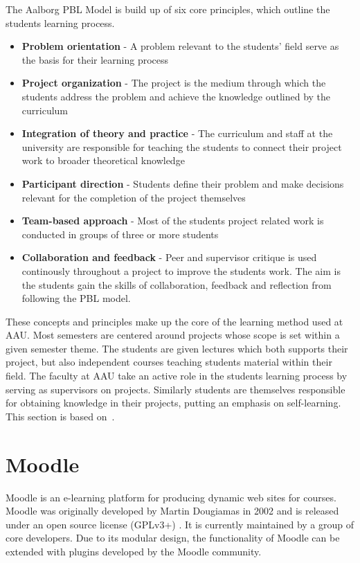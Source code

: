 The Aalborg PBL Model is build up of six core principles, which outline the students learning process.
\begin{itemize}
	\item \textbf{Problem orientation} - A problem relevant to the students' field serve as the basis for their learning process
	\item \textbf{Project organization} - The project is the medium through which the students address the problem and achieve the knowledge outlined by the curriculum
	\item \textbf{Integration of theory and practice} - The curriculum and staff at the university are responsible for teaching the students to connect their project work to broader theoretical knowledge
	\item \textbf{Participant direction} - Students define their problem and make decisions relevant for the completion of the project themselves
	\item \textbf{Team-based approach} - Most of the students project related work is conducted in groups of three or more students
	\item \textbf{Collaboration and feedback} - Peer and supervisor critique is used continously throughout a project to improve the students work. The aim is the students gain the skills of collaboration, feedback and reflection from following the PBL model. 
\end{itemize}

These concepts and principles make up the core of the learning method used at AAU. Most semesters are centered around projects whose scope is set within a given semester theme. The students are given lectures which both supports their project, but also independent courses teaching students material within their field. The faculty at AAU take an active role in the students learning process by serving as supervisors on projects. Similarly students are themselves responsible for obtaining knowledge in their projects, putting an emphasis on self-learning. This section is based on~\citep{Barge10}.

\section{Moodle}
Moodle is an e-learning platform for producing dynamic web sites for courses. Moodle was originally developed by Martin Dougiamas in 2002 and is released under an open source license (GPLv3+) \citep{gpl}. It is currently maintained by a group of core developers. Due to its modular design, the functionality of Moodle can be extended with plugins developed by the Moodle community.

